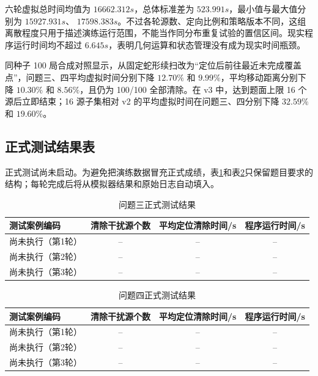 六轮虚拟总时间均值为 $16662.312\unit{s}$，总体标准差为
$523.991\unit{s}$，最小值与最大值分别为 $15927.931\unit{s}$、
$17598.383\unit{s}$。不过各轮源数、定向比例和策略版本不同，这组离散程度只用于描述演练运行范围，不能当作同分布重复试验的置信区间。现实程序运行时间均不超过 $6.645\unit{s}$，表明几何运算和状态管理没有成为现实时间瓶颈。

同种子 100 局合成对照显示，从固定蛇形续扫改为“定位后前往最近未完成覆盖点”，问题三、四平均虚拟时间分别下降 $12.70\%$ 和 $9.99\%$，平均移动距离分别下降 $10.30\%$ 和 $8.56\%$，且仍为 100/100 全部清除。在 v3 中，达到题面上限 16 个源后立即结束；16 源子集相对 v2 的平均虚拟时间在问题三、四分别下降 $32.59\%$ 和 $19.60\%$。

\subsection{正式测试结果表}

正式测试尚未启动。为避免把演练数据冒充正式成绩，表\ref{tab:formal3}和表\ref{tab:formal4}只保留题目要求的结构；每轮完成后将从模拟器结果和原始日志自动填入。

\begin{table}[htbp]
  \centering
  \caption{问题三正式测试结果}
  \label{tab:formal3}
  \begin{tabular}{lccc}
    \toprule
    测试案例编码 & 清除干扰源个数 & 平均定位清除时间/s & 程序运行时间/s \\
    \midrule
    尚未执行（第1轮） & -- & -- & -- \\
    尚未执行（第2轮） & -- & -- & -- \\
    尚未执行（第3轮） & -- & -- & -- \\
    \bottomrule
  \end{tabular}
\end{table}

\begin{table}[htbp]
  \centering
  \caption{问题四正式测试结果}
  \label{tab:formal4}
  \begin{tabular}{lccc}
    \toprule
    测试案例编码 & 清除干扰源个数 & 平均定位清除时间/s & 程序运行时间/s \\
    \midrule
    尚未执行（第1轮） & -- & -- & -- \\
    尚未执行（第2轮） & -- & -- & -- \\
    尚未执行（第3轮） & -- & -- & -- \\
    \bottomrule
  \end{tabular}
\end{table}
